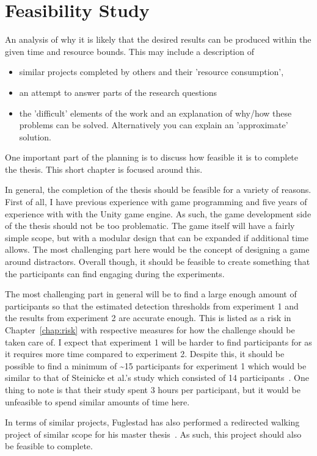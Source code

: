\chapter{Feasibility Study}
An analysis of why it is likely that the desired
results can be produced within the given time and
resource bounds.  This may include a description of
\begin{itemize}
\item similar projects completed by others and their 'resource consumption',
\item an attempt to answer parts of the research questions
\item the 'difficult' elements of the work and an explanation of why/how these problems can be solved.  
Alternatively you can explain an 'approximate' solution.
\end{itemize}
\fi

One important part of the planning is to discuss how feasible it is to complete the thesis. This short chapter is focused around this.


In general, the completion of the thesis should be feasible for a variety of reasons. First of all, I have previous experience with game programming and five years of experience with with the Unity game engine. As such, the game development side of the thesis should not be too problematic. The game itself will have a fairly simple scope, but with a modular design that can be expanded if additional time allows. The most challenging part here would be the concept of designing a game around distractors. Overall though, it should be feasible to create something that the participants can find engaging during the experiments.

The most challenging part in general will be to find a large enough amount of participants so that the estimated detection thresholds from experiment 1 and the results from experiment 2 are accurate enough. This is listed as a risk in Chapter~\ref{chap:risk} with respective measures for how the challenge should be taken care of. I expect that experiment 1 will be harder to find participants for as it requires more time compared to experiment 2. Despite this, it should be possible to find a minimum of \textasciitilde 15 participants for experiment 1 which would be similar to that of Steinicke et al.'s study which consisted of 14 participants~\cite{5072212}. One thing to note is that their study spent 3 hours per participant, but it would be unfeasible to spend similar amounts of time here. 

In terms of similar projects, Fuglestad has also performed a redirected walking project of similar scope for his master thesis~\cite{fuglestad2018redirected}. As such, this project should also be feasible to complete.